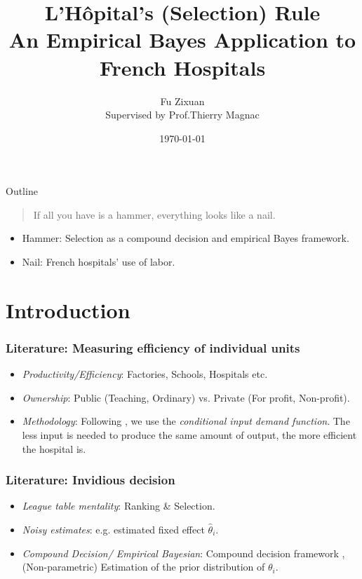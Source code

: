 \documentclass[10pt,mathserif,aspectratio=169]{beamer}
\title{\large \bfseries L'Hôpital's (Selection) Rule\\
  An Empirical Bayes Application to French Hospitals}
\author{Fu Zixuan\\[3ex]
  Supervised by Prof.Thierry Magnac}
\date{\today}
\begin{document}
\frame{
  \thispagestyle{empty}
  \titlepage
}
\begin{frame}{Outline}
  \begin{quote}
    If all you have is a hammer, everything looks like a nail.
  \end{quote}
  \begin{itemize}
    \item Hammer: Selection as a compound decision and empirical Bayes framework.
          \citep{robbins1956empirical,gu2023invidious}
    \item Nail: French hospitals' use of labor. \citep{croiset2024hospitals}
  \end{itemize}
\end{frame}
\section{Introduction}

\begin{frame}[label=literature]
  \frametitle{Literature: Measuring efficiency of individual units}
  \begin{itemize}\itemsep=12pt

    \item \textit{Productivity/Efficiency}: Factories, Schools, Hospitals etc.
    \item \textit{Ownership}: Public (Teaching, Ordinary) vs. Private (For profit, Non-profit).
    \item \textit{Methodology}: Following \citet{croiset2024hospitals}, we use the \textit{conditional input demand function}.
          The less input is needed to produce the same amount
          of output, the more efficient the hospital is.\hyperlink{inputdemand}{}
  \end{itemize}
\end{frame}

\begin{frame}
  \frametitle{Literature: Invidious decision}
  \begin{itemize}\itemsep=12pt
    \item \textit{League table mentality}: Ranking \& Selection.\citep{gu2023invidious}
    \item \textit{Noisy estimates}: e.g. estimated fixed effect $\hat{\theta}_i$. \citep{chetty2014measuring,kline2022systemic}
    \item \textit{Compound Decision/ Empirical Bayesian}: Compound decision framework \citep{robbins1956empirical}, (Non-parametric) Estimation of the prior distribution of $\theta_i$. \citep{koenker2014convex, gu2017empirical}
  \end{itemize}
\end{frame}
\end{document}
